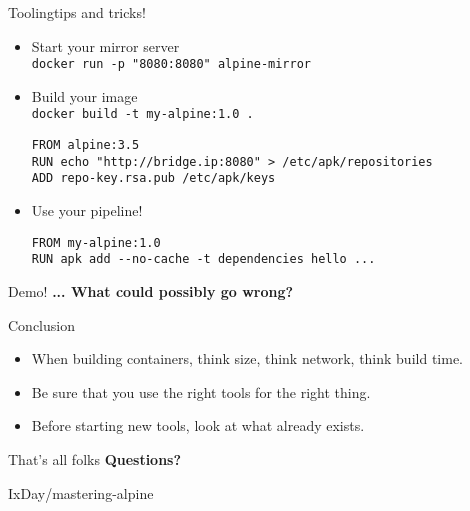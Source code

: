 \documentclass[aspectratio=169]{beamer}
\begin{document}
\begin{frame}[fragile]{Tooling}{tips and tricks!}
  \begin{itemize}
\item Start your mirror server\\
      \texttt{docker run -p "8080:8080" alpine-mirror}
    \item Build your image \\ \texttt{docker build -t my-alpine:1.0 .}
      \begin{verbatim}
FROM alpine:3.5
RUN echo "http://bridge.ip:8080" > /etc/apk/repositories
ADD repo-key.rsa.pub /etc/apk/keys
      \end{verbatim}

    \item Use your pipeline!
      \begin{verbatim}
FROM my-alpine:1.0
RUN apk add --no-cache -t dependencies hello ...
      \end{verbatim}

  \end{itemize}

\end{frame}

\begin{frame}{Demo!}
  \LARGE \textbf{... What could possibly go wrong?}
\end{frame}

\begin{frame}{Conclusion}
  \begin{itemize}
    \item When building containers, think size, think network, think build time.
    \item Be sure that you use the right tools for the right thing.
    \item Before starting new tools, look at what already exists.
  \end{itemize}
\end{frame}

\begin{frame}{That's all folks}
  \LARGE \textbf{Questions?}

  \begin{flushright}
    \normalsize \color{Green}IxDay\color{Grey}/mastering-alpine
   \end{flushright}
\end{frame}
\end{document}
